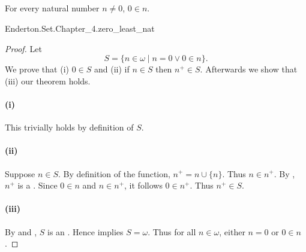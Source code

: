 \documentclass{report}
\begin{document}
\subsection{}%

  \begin{lemma}
    For every natural number $n \neq 0$, $0 \in n$.
  \end{lemma}

    {Enderton.Set.Chapter\_4.zero\_least\_nat}


  \begin{proof}

    Let $$S = \{n \in \omega \mid n = 0 \lor 0 \in n\}.$$
    We prove that (i) $0 \in S$ and (ii) if $n \in S$ then $n^+ \in S$.
    Afterwards we show that (iii) our theorem holds.

    \paragraph{(i)}%

      This trivially holds by definition of $S$.

    \paragraph{(ii)}%

      Suppose $n \in S$.
      By definition of the  function,
        $n^+ = n \cup \{n\}$.
      Thus $n \in n^+$.
      By , $n^+$ is a .
      Since $0 \in n$ and $n \in n^+$, it follows $0 \in n^+$.
      Thus $n^+ \in S$.

    \paragraph{(iii)}%

      By  and
        , $S$ is an
        .
      Hence  implies $S = \omega$.
      Thus for all $n \in \omega$, either $n = 0$ or $0 \in n$.

  \end{proof}
\end{document}
